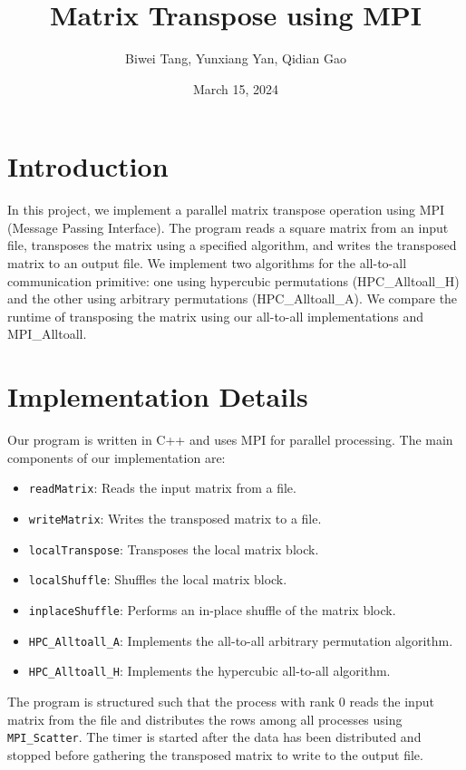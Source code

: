 \documentclass{article}
\title{Matrix Transpose using MPI}
\author{Biwei Tang, Yunxiang Yan, Qidian Gao}
\date{March 15, 2024}
\begin{document}
\maketitle

\section{Introduction}
In this project, we implement a parallel matrix transpose operation using MPI (Message Passing Interface). The program reads a square matrix from an input file, transposes the matrix using a specified algorithm, and writes the transposed matrix to an output file. We implement two algorithms for the all-to-all communication primitive: one using hypercubic permutations (HPC\_Alltoall\_H) and the other using arbitrary permutations (HPC\_Alltoall\_A). We compare the runtime of transposing the matrix using our all-to-all implementations and MPI\_Alltoall.

\section{Implementation Details}
Our program is written in C++ and uses MPI for parallel processing. The main components of our implementation are:

\begin{itemize}
    \item \texttt{readMatrix}: Reads the input matrix from a file.
    \item \texttt{writeMatrix}: Writes the transposed matrix to a file.
    \item \texttt{localTranspose}: Transposes the local matrix block.
    \item \texttt{localShuffle}: Shuffles the local matrix block.
    \item \texttt{inplaceShuffle}: Performs an in-place shuffle of the matrix block.
    \item \texttt{HPC\_Alltoall\_A}: Implements the all-to-all arbitrary permutation algorithm.
    \item \texttt{HPC\_Alltoall\_H}: Implements the hypercubic all-to-all algorithm.
\end{itemize}

The program is structured such that the process with rank 0 reads the input matrix from the file and distributes the rows among all processes using \texttt{MPI\_Scatter}. The timer is started after the data has been distributed and stopped before gathering the transposed matrix to write to the output file.
\end{document}
